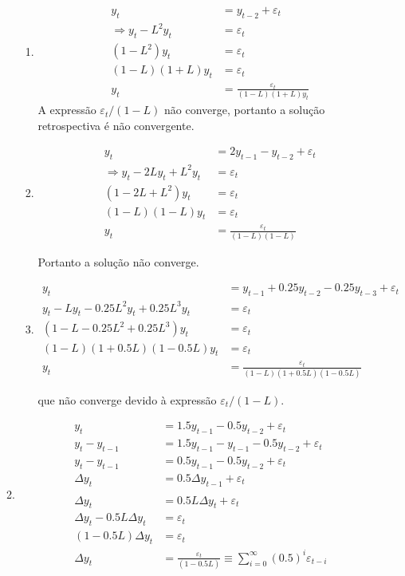 \begin{enumerate}
\begin{enumerate}
\begin{enumerate}
	\item
	 \begin{align*}
		y_t&=y_{t-2}+\varepsilon_t\\
		\Rightarrow y_t-L^2y_t&=\varepsilon_t\\
		(1-L^2)y_t&=\varepsilon_t\\
		(1-L)(1+L)y_t&=\varepsilon_t\\
		y_t&=\frac{\varepsilon_t}{(1-L)(1+L)y_t}
	\end{align*}
	A expressão $\varepsilon_t/(1-L)$ não converge, portanto a solução retrospectiva é não convergente.
	
	\item
	\begin{align*}
		y_t&=2y_{t-1}-y_{t-2}+\varepsilon_t\\
		\Rightarrow y_t-2Ly_t+L^2y_t&=\varepsilon_t\\
		(1-2L+L^2)y_t&=\varepsilon_t\\
		(1-L)(1-L)y_t&=\varepsilon_t\\
		y_t&=\frac{\varepsilon_t}{(1-L)(1-L)}
	\end{align*}
	
	Portanto a solução não converge.
	
	\item
	\begin{align*}
		y_t&=y_{t-1}+0.25y_{t-2}-0.25y_{t-3}+\varepsilon_t\\
		y_t-Ly_t-0.25L^2y_t+0.25L^3y_t&=\varepsilon_t\\
		(1-L-0.25L^2+0.25L^3)y_t&=\varepsilon_t\\
		(1-L)(1+0.5L)(1-0.5L)y_t&=\varepsilon_t\\
		y_t&=\frac{\varepsilon_t}{(1-L)(1+0.5L)(1-0.5L)}
	\end{align*}
	
	que não converge devido à expressão $\varepsilon_t/(1-L)$.	
\end{enumerate}	
\item
\begin{align*}
	y_t&=1.5y_{t-1}-0.5y_{t-2}+\varepsilon_t\\
	y_t-y_{t-1}&=1.5y_{t-1}-y_{t-1}-0.5y_{t-2}+\varepsilon_t\\
	y_t-y_{t-1}&=0.5y_{t-1}-0.5y_{t-2}+\varepsilon_t\\
	\Delta y_t&=0.5\Delta y_{t-1}+\varepsilon_t\\
	\\
	\Delta y_t&=0.5L\Delta y_{t}+\varepsilon_t\\
	\Delta y_t-0.5L\Delta y_{t}&=\varepsilon_t\\
	(1-0.5L)\Delta y_t&=\varepsilon_t\\
	\Delta y_t&=\frac{\varepsilon_t}{(1-0.5L)}\equiv \sum\limits_{i=0}^{\infty}(0.5)^i\varepsilon_{t-i}
\end{align*}


\end{enumerate}
\end{enumerate}
